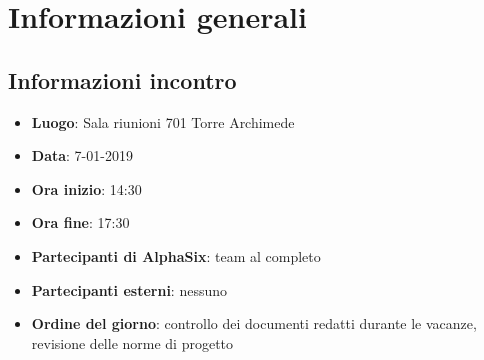 \newcommand{\documento}{\VI}
\newcommand{\nomedocumentofisico}{VI\_07\_01\_2018.pdf}
\newcommand{\redazione}{\TG}
\newcommand{\verifica}{\NC}
\newcommand{\approvazione}{\SG}
\newcommand{\versione}{1.0.0}
\newcommand{\uso}{Interno}
\newcommand{\destinateTo}{\TV, \\ & \RC, \\ & \II}
\newcommand{\datacreazione}{8 gennaio 2019}
\newcommand{\datamodifica}{9 gennaio 2019}
\newcommand{\stato}{Approvato}

\def\TABELLE{false}	%
\def\FIGURE{false} 	%






    

    
    
	
    
    \section{Informazioni generali}
		\subsection{Informazioni incontro}
			\begin{itemize}
				\item { \textbf{Luogo}: Sala riunioni 701 Torre Archimede}
				\item { \textbf{Data}: 7-01-2019}
				\item { \textbf{Ora inizio}: 14:30}
				\item { \textbf{Ora fine}: 17:30}
				\item { \textbf{Partecipanti di AlphaSix}: team al completo}
				\item { \textbf{Partecipanti esterni}: nessuno}
				\item { \textbf{Ordine del giorno}: controllo dei documenti redatti durante le vacanze, revisione delle norme di progetto}
			\end{itemize}

